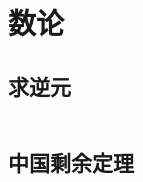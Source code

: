 \chapter{数论}
\section{求逆元}
\inputminted{cpp}{\source/number-theory/get-inversion.cpp}
\section{中国剩余定理}
\inputminted{cpp}{\source/number-theory/chinese-remainder-theorem.cpp}
